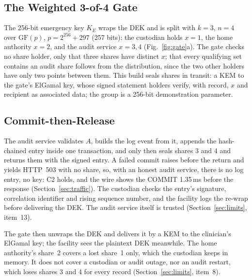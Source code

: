 \subsection{The Weighted 3-of-4 Gate}

The 256-bit emergency key $K_E$ wraps the DEK and is split with $k=3$,
$n=4$ over $\mathrm{GF}(p)$, $p=2^{256}+297$ (257 bits): the custodian holds
$x=1$, the home authority $x=2$, and the audit service $x=3,4$
(Fig.~\ref{fig:gate}a).
The gate checks no share holder, only that three shares have distinct $x$;
that every qualifying set contains an audit share follows from the
distribution, since the two other holders have only two points between them.
This build seals shares in transit: a KEM to the gate's
ElGamal key, whose signed statement holders verify, with record, $x$ and
recipient as associated data; the group is a 256-bit demonstration
parameter.

\subsection{Commit-then-Release}

The audit service validates $A$, builds the log event from it, appends the
hash-chained entry inside one transaction, and only then seals shares 3
and 4 and returns them with the signed entry.
A failed commit raises before the return and yields HTTP~503 with no share,
so, with an honest audit service, there is no log entry, no key: C2 holds, and the wire shows the COMMIT
1.35\,ms before the response (Section~\ref{sec:traffic}).
The custodian checks the entry's signature, correlation identifier and
rising sequence number, and the facility logs the re-wrap before delivering
the DEK.
The audit service itself is trusted (Section~\ref{sec:limits}, item~13).

The gate then unwraps the DEK and delivers it by a KEM to the clinician's
ElGamal key; the facility sees the plaintext DEK meanwhile.
The home authority's share~2 covers a lost share~1 only, which the custodian
keeps in memory.
It does not cover a custodian or audit outage, nor an audit restart, which
loses shares 3 and 4 for every record (Section~\ref{sec:limits}, item~8).

